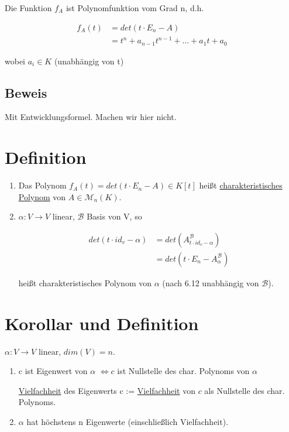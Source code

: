 \documentclass[a4paper, openany]{book}
\begin{document}
        Die Funktion $f_A$ ist Polynomfunktion vom Grad n, d.h.

        \begin{align*}
          f_A(t) & = det(t \cdot E_n -A) \\
                 & = t^n + a_{n-1}t^{n-1} + ... + a_1t + a_0
        \end{align*}

        wobei $a_i \in K$ (unabhängig von t)

        \subsection{Beweis}

        Mit Entwicklungsformel. Machen wir hier nicht.

        \section{Definition}

        \begin{enumerate}[label=(\alph*)]
          \item Das Polynom $f_A(t) = det(t \cdot E_n -A) \in K[t]$ heißt \underline{charakteristisches Polynom} von $A \in \mathcal{M}_n(K)$.

          \item $\alpha : V \rightarrow V$ linear, $\mathcal{B}$ Basis von V, so 

          \begin{align*}
            det(t \cdot id_v - \alpha) & = det(A_{t \cdot id_v -\alpha}^{\mathcal{B}}) \\
                                       & = det(t \cdot E_n - A_{\alpha}^{\mathcal{B}})
          \end{align*}

          heißt charakteristisches Polynom von $\alpha$ (nach 6.12 unabhängig von $\mathcal{B}$).
        \end{enumerate} 

        \section{Korollar und Definition}

        $\alpha : V \rightarrow V$ linear, $dim(V) = n$.

        \begin{enumerate}[label=(\alph*)]
          \item c ist Eigenwert von $\alpha$ $\Leftrightarrow c$ ist Nullstelle des char. Polynoms von $\alpha$

          \par \medskip

          \underline{Vielfachheit} des Eigenwerts c := \underline{Vielfachheit} von $c$ als Nullstelle des char. Polynoms. 

          \item $\alpha$ hat höchstens n Eigenwerte (einschließlich Vielfachheit).
        \end{enumerate}
\end{document}
